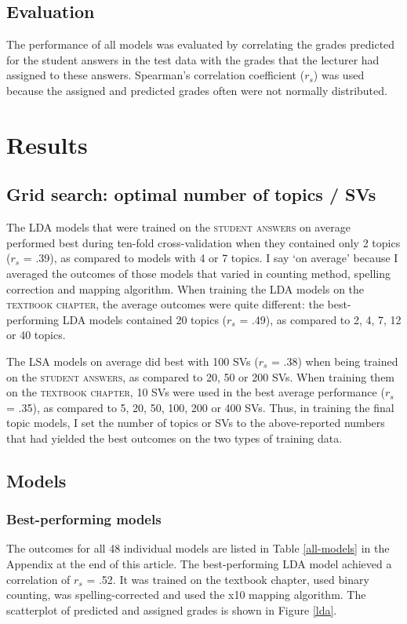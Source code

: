 \documentclass[a4paper,10pt,twoside]{article}
\begin{document}
\subsection{Evaluation}
\label{sec:evaluation}
The performance of all models was evaluated by correlating the grades predicted for the student answers in the test data with the grades that the lecturer had assigned to these answers. Spearman's correlation coefficient ($\textit{r}_s$) was used because the assigned and predicted grades often were not normally distributed.

\section{Results}

\subsection{Grid search: optimal number of topics / SVs}
The LDA models that were trained on the \textsc{student answers} on average performed best during ten-fold cross-validation when they contained only 2 topics ($\textit{r}_s$ = .39), as compared to models with 4 or 7 topics. I say `on average' because I averaged the outcomes of those models that varied in counting method, spelling correction and mapping algorithm. When training the LDA models on the \textsc{textbook chapter}, the average outcomes were quite different: the best-performing LDA models contained 20 topics ($\textit{r}_s$ = .49), as compared to 2, 4, 7, 12 or 40 topics.

The LSA models on average did best with 100 SVs ($\textit{r}_s$ = .38) when being trained on the \textsc{student answers}, as compared to 20, 50 or 200 SVs. When training them on the \textsc{textbook chapter}, 10 SVs were used in the best average performance ($\textit{r}_s$ = .35), as compared to 5, 20, 50, 100, 200 or 400 SVs. Thus, in training the final topic models, I set the number of topics or SVs to the above-reported numbers that had yielded the best outcomes on the two types of training data.

\subsection{Models}
\label{sec:averageoutcomes}

\subsubsection{Best-performing models}
The outcomes for all 48 individual models are listed in Table \ref{all-models} in the Appendix at the end of this article. The best-performing LDA model achieved a correlation of $\textit{r}_s$ = .52. It was trained on the textbook chapter, used binary counting, was spelling-corrected and used the x10 mapping algorithm. The scatterplot of predicted and assigned grades is shown in Figure \ref{lda}.
\end{document}
